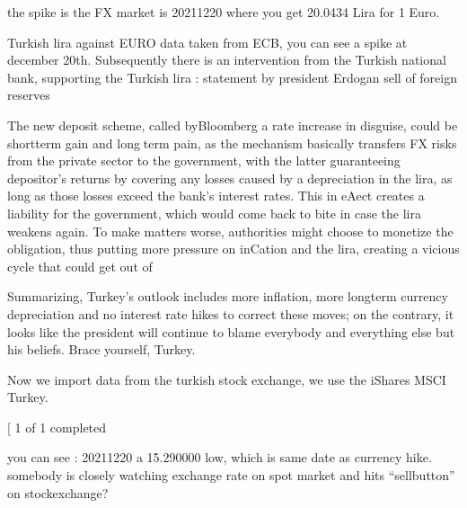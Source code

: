 \documentclass[letterpaper,10pt,english]{sphinxmanual}
\begin{document}
\sphinxAtStartPar
the spike is the FX \sphinxhyphen{} market is 2021\sphinxhyphen{}12\sphinxhyphen{}20 where you get 20.0434 Lira
for 1 Euro.

\begin{sphinxVerbatim}[commandchars=\\\{\}]
\end{sphinxVerbatim}

\noindent{}

\sphinxAtStartPar
Turkish lira against EURO \sphinxhyphen{} data taken from ECB, you can see a spike at
december 20th. Subsequently there is an intervention from the Turkish
national bank, supporting the Turkish lira : \sphinxhyphen{} statement by president
Erdogan \sphinxhyphen{} sell of foreign reserves

\sphinxAtStartPar
The new deposit scheme, called byBloomberg a rate increase in disguise,
could be short\sphinxhyphen{}term gain and longterm pain, as the mechanism basically
transfers FX risks from the private sector to the government, with the
latter guaranteeing depositor’s returns by covering any losses caused by
a depreciation in the lira, as long as those losses exceed the bank’s
interest rates. This in eAect creates a liability for the government,
which would come back to bite in case the lira weakens again. To make
matters worse, authorities might choose to monetize the obligation, thus
putting more pressure on inCation and the lira, creating a vicious cycle
that could get out of

\sphinxAtStartPar
Summarizing, Turkey’s outlook includes more inflation, more long\sphinxhyphen{}term
currency depreciation and no interest rate hikes to correct these moves;
on the contrary, it looks like the president will continue to blame
everybody and everything else but his beliefs. Brace yourself, Turkey.

\sphinxAtStartPar
Now we import data from the turkish stock exchange, we use the iShares
MSCI Turkey.
\begin{sphinxalltt}
{[}\sphinxstylestrong{*******************100\%*********************}{]}  1 of 1 completed
\end{sphinxalltt}



\sphinxAtStartPar
you can see : 2021\sphinxhyphen{}12\sphinxhyphen{}20 a 15.290000 low, which is same date as currency
hike.  somebody is closely watching exchange rate on spot
market and hits “sell\sphinxhyphen{}button” on stock\sphinxhyphen{}exchange?
\end{document}

